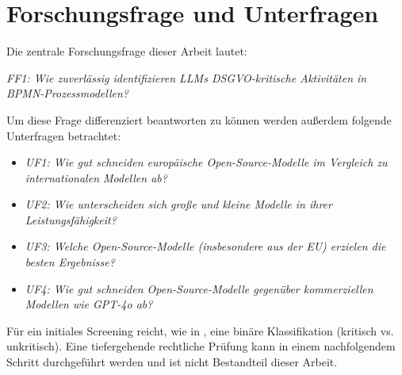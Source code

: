 \section{Forschungsfrage und Unterfragen}\label{sec:forschungsfrage-und-unterfragen}

Die zentrale Forschungsfrage dieser Arbeit lautet:

\emph{FF1: Wie zuverlässig identifizieren \acp{LLM} \ac{DSGVO}-kritische Aktivitäten in \ac{BPMN}-Prozessmodellen?}

Um diese Frage differenziert beantworten zu können werden außerdem folgende Unterfragen betrachtet:

\begin{itemize}
    \item \emph{UF1: Wie gut schneiden europäische Open-Source-Modelle im Vergleich zu internationalen Modellen ab?}
    \item \emph{UF2: Wie unterscheiden sich große und kleine Modelle in ihrer Leistungsfähigkeit?}
    \item \emph{UF3: Welche Open-Source-Modelle (insbesondere aus der EU) erzielen die besten Ergebnisse?}
    \item \emph{UF4: Wie gut schneiden Open-Source-Modelle gegenüber kommerziellen Modellen wie GPT-4o ab?}
\end{itemize}

Für ein initiales Screening reicht, wie in \cite{nake2023towards}, eine binäre Klassifikation (kritisch vs. unkritisch). Eine tiefergehende rechtliche Prüfung kann in einem nachfolgendem Schritt durchgeführt werden und ist nicht Bestandteil dieser Arbeit.